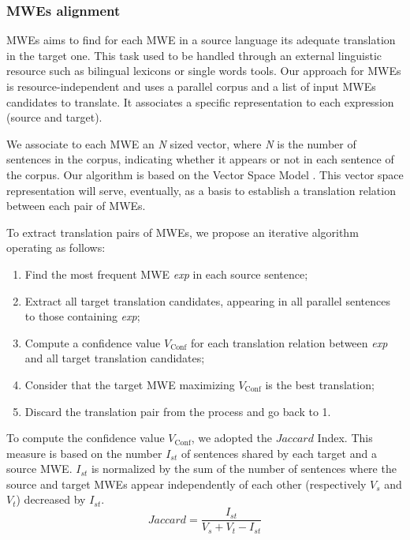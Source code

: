 \documentclass[output=paper,modfonts,nonflat]{langsci/langscibook}
\begin{document}
\subsubsection{MWEs alignment}\label{sec:semmar:4.2.2}
MWEs  aims to find for each MWE in a source language its adequate translation in the target one. 
This task used to be handled through an external linguistic resource such as bilingual lexicons or single words  tools. Our approach for MWEs  is resource-independent and uses a parallel corpus and a list of input MWEs candidates to translate. It associates a specific representation to each expression (source and target). 

We associate to each MWE an \textit{N} sized vector, where \textit{N} is the number of sentences in the corpus, indicating whether it appears or not in each sentence of the corpus. 
Our algorithm is based on the Vector Space Model \citep{salton1975vector}.
This vector space representation will serve, eventually, as a basis to establish a translation relation between each pair of MWEs. 
 
To extract translation pairs of MWEs, we propose an iterative  algorithm operating as follows:
\begin{enumerate}
\item Find the most frequent MWE \textit{exp} in each source sentence;
\item Extract all target translation candidates, appearing in all parallel sentences to those containing \textit{exp};
\item Compute a confidence value $V_{\text{Conf}}$ for each translation relation between \textit{exp} and all target translation candidates;
\item Consider that the target MWE maximizing $V_{\text{Conf}}$ is the best translation;
\item Discard the translation pair from the process and go back to 1.
\end{enumerate}

To compute the confidence value $V_{\text{Conf}}$, we adopted the $\mathit{Jaccard}$ Index. %
This measure is based on the number $I_{st}$ of sentences shared by each target and a source MWE. 
$I_{st}$ is normalized by the sum of the number of sentences where the source and target MWEs appear independently of each other (respectively $V_s$ and $V_t$) decreased by $I_{st}$. 
 \begin{equation}
 \label{sem:jaccard}
  \mathit{Jaccard}=\frac{I_{st}}{V_s+V_t-I_{st}}
 \end{equation}
\end{document}
